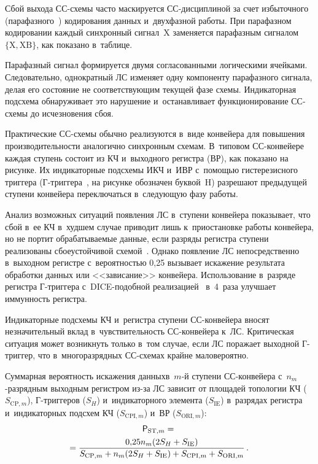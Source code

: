 \begin{multicols}{2}
\vspace*{9pt}
  
  Сбой выхода СС-схе\-мы часто маскируется СС-дис\-цип\-ли\-ной за счет 
избыточного (парафазного~\cite{9-step}) кодирования данных и~двухфазной 
работы. При парафазном кодировании каждый синхронный сигнал~X 
заменяется парафазным сигналом $\{\mathrm{X, XB}\}$, как показано 
в~таб\-лице. 
  

  
  Парафазный сигнал формируется двумя согласованными логическими 
ячейками. Следовательно, однократный ЛС изменяет одну компоненту 
парафазного сигнала, делая его состояние не соответствующим текущей фазе 
схемы. Индикаторная подсхема обнаруживает это нарушение 
и~оста\-нав\-ли\-ва\-ет функционирование СС-схе\-мы до исчезновения сбоя.
  
  Практические СС-схе\-мы обычно реализуются в~виде конвейера для 
повышения про\-из\-во\-ди\-тель\-ности аналогично синхронным схемам. 
В~типовом СС-кон\-вей\-ере каждая ступень состоит из КЧ 
и~выходного регистра (ВР), как показано на рисунке. Их 
индикаторные подсхемы ИКЧ и~ИВР с~помощью гистерезисного триггера  
(Г-триг\-ге\-ра~\cite{9-step}, на рисунке обозначен буквой~H) разрешают 
предыдущей ступени конвейера переключаться в~следующую фазу работы.
  
  Анализ возможных ситуаций появления ЛС в~ступени конвейера 
показывает, что сбой в~ее КЧ в~худшем случае приводит 
лишь к~приостановке работы конвейера, но не портит обрабатываемые 
данные, если разряды регистра ступени реализованы сбоеустойчивой 
схемой~\cite[Fig.~10]{16-step}. Однако появление ЛС непосредственно 
в~выходном регистре с~вероятностью 0,25 вызывает искажение результата 
обработки данных или <<зависание>> конвейера. Использование в~разряде 
регистра \mbox{Г-триг}\-ге\-ра с~DICE-по\-доб\-ной  
реализацией~\cite[Fig.~12]{16-step} в~4~раза улучшает иммунность регистра.
  
Индикаторные подсхемы КЧ и~регистра ступени  
СС-кон\-вей\-ера вносят незначительный вклад в~чувствительность  
СС-кон\-вей\-ера к~ЛС. Критическая ситуация может возникнуть только в~том 
случае, если ЛС поражает выходной Г-триг\-гер, что в~многоразрядных  
СС-схе\-мах крайне маловероятно.
  

  
  Суммарная вероятность искажения данных\linebreak в~$m$-й ступени  
СС-кон\-вей\-ера с~$n_m$-раз\-ряд\-ным выходным регистром из-за 
ЛС зависит от площадей топологии КЧ
($S_{\mathrm{CP},m}$), Г-триг\-ге\-ров ($S_H$) и~индикаторного элемента ($S_{\mathrm{IE}}$) 
в~разрядах регистра и~индикаторных подсхем КЧ
($S_{\mathrm{CPI},m}$) и~ВР ($S_{\mathrm{ORI},m}$):
  \begin{multline}
  {\sf P}_{\mathrm{ST},m} ={}\\
  \!\!\!{}=\displaystyle\frac{\displaystyle 0{,}25 n_m (2S_H+S_{\mathrm{IE}})\mathstrut}{\displaystyle S_{\mathrm{CP},m} +n_m(2S_H+S_{\mathrm{IE}}) 
+S_{\mathrm{CPI},m} +S_{\mathrm{ORI},m}\mathstrut}\,.\!
  \label{e3-step}
  \end{multline}
  

\end{multicols}
